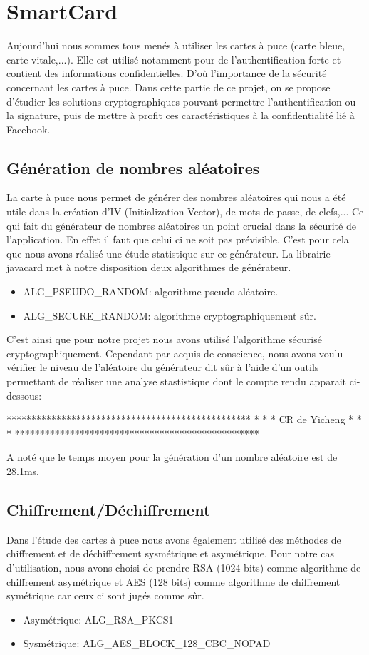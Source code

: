 \documentclass[a4paper,11pt,french]{article}
\begin{document}
\section{SmartCard}
Aujourd'hui nous sommes tous menés à utiliser les cartes à puce (carte bleue, carte vitale,...). 
Elle est utilisé notamment pour de l'authentification forte et contient des informations confidentielles.
D'où l'importance de la sécurité concernant les cartes à puce.
Dans cette partie de ce projet, on se propose d'étudier les solutions cryptographiques pouvant
permettre l'authentification ou la signature, puis de mettre à profit ces caractéristiques
à la confidentialité lié à Facebook.


\subsection{Génération de nombres aléatoires}
La carte à puce nous permet de générer des nombres aléatoires qui nous a été utile dans la création d'IV (Initialization Vector),
de mots de passe, de clefs,... Ce qui fait du générateur de nombres aléatoires un point crucial dans la sécurité de l'application.
En effet il faut que celui ci ne soit pas prévisible. C'est pour cela que nous avons réalisé une étude statistique sur ce générateur.
La librairie javacard met à notre disposition deux algorithmes de générateur. 
\begin{itemize} 
	\item ALG\_PSEUDO\_RANDOM: algorithme pseudo aléatoire.
	\item ALG\_SECURE\_RANDOM: algorithme cryptographiquement sûr.
\end{itemize}

C'est ainsi que pour notre projet nous avons utilisé l'algorithme sécurisé cryptographiquement. Cependant
par acquis de conscience, nous avons voulu vérifier le niveau de l'aléatoire du générateur dit sûr à l'aide d'un
outils permettant de réaliser une analyse stastistique dont le compte rendu apparait ci-dessous:

*************************************************
*						*
*                  CR de Yicheng		*
*						*
*************************************************

A noté que le temps moyen pour la génération d'un nombre aléatoire est de 28.1ms.

\subsection{Chiffrement/Déchiffrement}
Dans l'étude des cartes à puce nous avons également utilisé des méthodes de chiffrement et de déchiffrement sysmétrique et asymétrique.
Pour notre cas d'utilisation, nous avons choisi de prendre RSA (1024 bits) comme algorithme de chiffrement asymétrique et AES (128 bits)
comme algorithme de chiffrement symétrique car ceux ci sont jugés comme sûr.
\begin{itemize}
	\item Asymétrique: ALG\_RSA\_PKCS1
	\item Sysmétrique: ALG\_AES\_BLOCK\_128\_CBC\_NOPAD 
\end{itemize}
\end{document}
